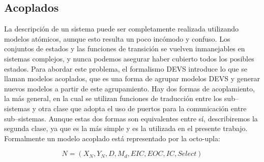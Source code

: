 	\subsection{Acoplados}
	La descripción de un sistema puede ser completamente realizada utilizando modelos atómicos, aunque esto resulta un poco incómodo y confuso. 
	Los conjuntos de estados y las funciones de transición se vuelven inmanejables en sistemas complejos, y nunca podemos asegurar haber cubierto todos 
	los posibles estados.
	Para abordar este problema, el formalismo DEVS introduce lo que se llaman modelos acoplados, que es una forma de agrupar modelos DEVS y generar 
	nuevos modelos a partir de este agrupamiento.
	Hay dos formas de acoplamiento, la más general, en la cual se utilizan funciones de traducción entre los sub–sistemas y otra clase que adopta el 
	uso de puertos para la comunicación entre sub–sistemas. Aunque estas dos formas son equivalentes entre sí, describiremos la segunda clase, ya que 
	es la más simple y es la utilizada en el presente trabajo.
	Formalmente un modelo acoplado está representado por la octo-upla:

	\begin{equation}
	N = (X_N , Y_N , D, {M_d }, EIC, EOC, IC, Select)
	\end{equation}

